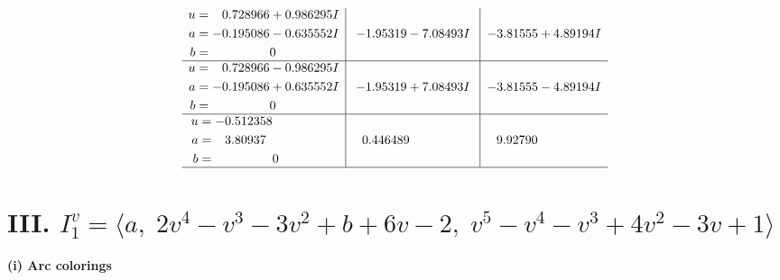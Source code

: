 \documentclass[1p]{elsarticle_modified}
\theoremstyle{definition}
\begin{document}
$$\begin{array}{c|c|c}
\begin{aligned}
u &= \phantom{-}0.728966 + 0.986295 I \\
a &= -0.195086 - 0.635552 I \\
b &= \phantom{-0.000000 } 0\end{aligned}
 & -1.95319 - 7.08493 I & -3.81555 + 4.89194 I \\ \hline\begin{aligned}
u &= \phantom{-}0.728966 - 0.986295 I \\
a &= -0.195086 + 0.635552 I \\
b &= \phantom{-0.000000 } 0\end{aligned}
 & -1.95319 + 7.08493 I & -3.81555 - 4.89194 I \\ \hline\begin{aligned}
u &= -0.512358\phantom{ +0.000000I} \\
a &= \phantom{-}3.80937\phantom{ +0.000000I} \\
b &= \phantom{-0.000000 } 0\end{aligned}
 & \phantom{-}0.446489\phantom{ +0.000000I} & \phantom{-}9.92790\phantom{ +0.000000I}\\
 \hline 
 \end{array}$$\newpage\newpage\renewcommand{\arraystretch}{1}
\centering \section*{III. $I^v_{1}= \langle a,\;2 v^4- v^3-3 v^2+b+6 v-2,\;v^5- v^4- v^3+4 v^2-3 v+1 \rangle$}
\flushleft \textbf{(i) Arc colorings}\\
\end{document}
